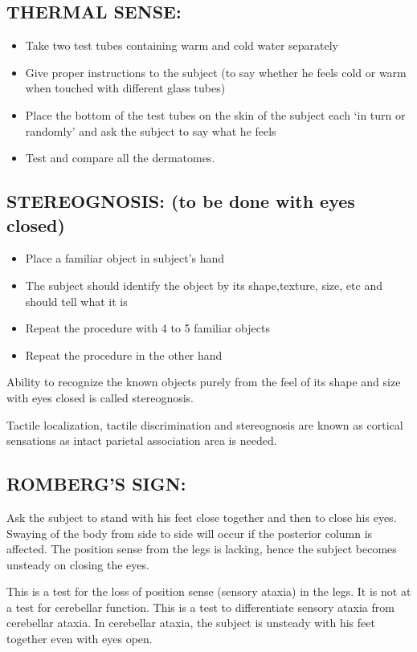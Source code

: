 \documentclass[a4paper,12pt]{book}
\begin{document}
	\subsection*{THERMAL SENSE:}
	\begin{itemize}
\item{Take two test tubes containing warm and cold water separately}
\item{Give proper instructions to the subject (to say whether he feels cold or warm when touched with different glass tubes)}
\item{Place the bottom of the test tubes on the skin of the subject each ‘in turn or randomly’ and ask the subject to say what he feels}
\item{Test and compare all the dermatomes.}
	\end{itemize}
	\subsection*{STEREOGNOSIS: (to be done with eyes closed)}
\begin{itemize}
\item{Place a familiar object in subject’s hand}
\item{The subject should identify the object by its shape,texture, size, etc and should tell what it is}
\item{Repeat the procedure with 4 to 5 familiar objects}
\item{Repeat the procedure in the other hand}
	\end{itemize}
	\par
	Ability to recognize the known objects purely from the feel of its shape and size with eyes closed is called stereognosis.
	\par
	Tactile localization, tactile discrimination and stereognosis are known as cortical sensations as intact parietal association area is needed.
\subsection*{ROMBERG’S SIGN:}
\par
	Ask the subject to stand with his feet close together and then to close his eyes. Swaying of the body from side to side will occur if the posterior column is affected. The position sense from the legs is lacking, hence the subject becomes unsteady on closing the eyes.
	\par
	This is a test for the loss of position sense (sensory ataxia) in the legs. It is not at a test for cerebellar function. This is a test to differentiate sensory ataxia from cerebellar ataxia. In cerebellar ataxia, the subject is unsteady with his feet together even with eyes open.
\end{document}
